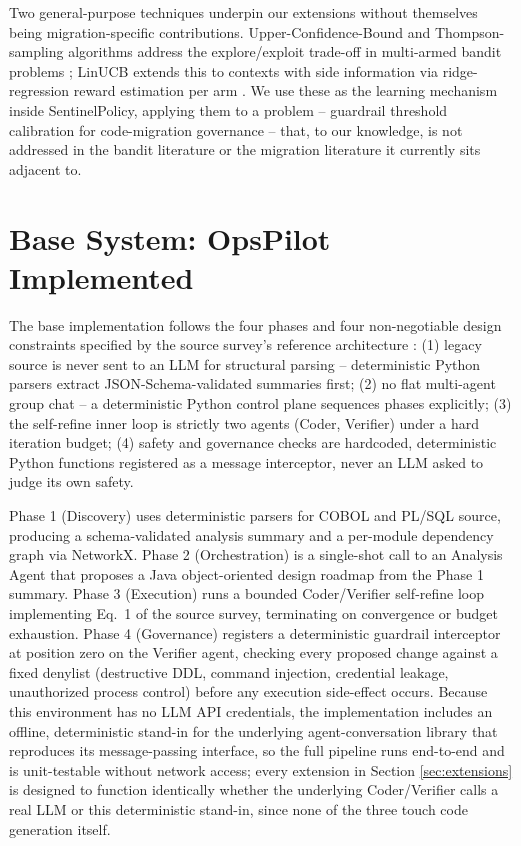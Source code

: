 \documentclass[conference]{IEEEtran}
\begin{document}
Two general-purpose techniques underpin our extensions without themselves
being migration-specific contributions. Upper-Confidence-Bound and
Thompson-sampling algorithms address the explore/exploit trade-off in
multi-armed bandit problems \cite{ucb, thompson1933, thompsontutorial};
LinUCB extends this to contexts with side information via ridge-regression
reward estimation per arm \cite{linucb}. We use these as the learning
mechanism inside SentinelPolicy, applying them to a problem -- guardrail
threshold calibration for code-migration governance -- that, to our
knowledge, is not addressed in the bandit literature or the migration
literature it currently sits adjacent to.

\section{Base System: OpsPilot Implemented}
\label{sec:base}

The base implementation follows the four phases and four non-negotiable
design constraints specified by the source survey's reference architecture
\cite{survey}: (1) legacy source is never sent to an LLM for structural
parsing -- deterministic Python parsers extract JSON-Schema-validated
summaries first; (2) no flat multi-agent group chat -- a deterministic Python
control plane sequences phases explicitly; (3) the self-refine inner loop is
strictly two agents (Coder, Verifier) under a hard iteration budget; (4)
safety and governance checks are hardcoded, deterministic Python functions
registered as a message interceptor, never an LLM asked to judge its own
safety.

Phase 1 (Discovery) uses deterministic parsers for COBOL and PL/SQL source,
producing a schema-validated analysis summary and a per-module dependency
graph via NetworkX. Phase 2 (Orchestration) is a single-shot call to an
Analysis Agent that proposes a Java object-oriented design roadmap from the
Phase 1 summary. Phase 3 (Execution) runs a bounded Coder/Verifier self-refine
loop implementing Eq.~1 of the source survey, terminating on convergence or
budget exhaustion. Phase 4 (Governance) registers a deterministic guardrail
interceptor at position zero on the Verifier agent, checking every proposed
change against a fixed denylist (destructive DDL, command injection,
credential leakage, unauthorized process control) before any execution
side-effect occurs. Because this environment has no LLM API credentials, the
implementation includes an offline, deterministic stand-in for the underlying
agent-conversation library that reproduces its message-passing interface, so
the full pipeline runs end-to-end and is unit-testable without network
access; every extension in Section \ref{sec:extensions} is designed to
function identically whether the underlying Coder/Verifier calls a real LLM
or this deterministic stand-in, since none of the three touch code
generation itself.
\end{document}
